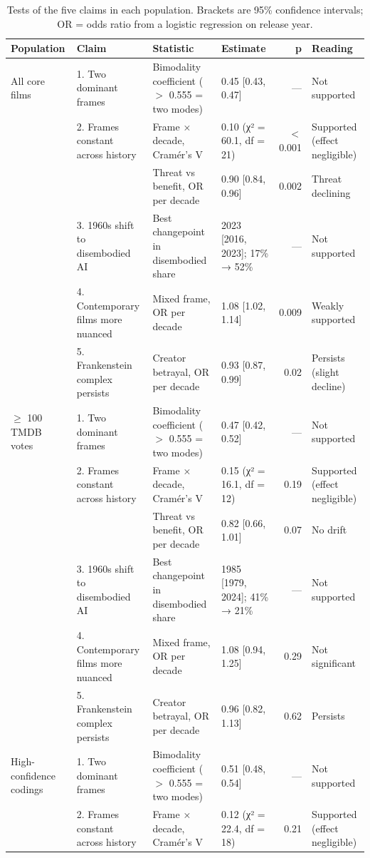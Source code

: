 \begin{table}[htbp]
\centering
\caption{Tests of the five claims in each population. Brackets are 95\% confidence intervals; OR = odds ratio from a logistic regression on release year.}
\label{tab:claim_tests}
\begin{tabular}{llllrl}
\toprule
Population & Claim & Statistic & Estimate & p & Reading \\
\midrule
All core films & 1. Two dominant frames & Bimodality coefficient ($>$ 0.555 = two modes) & 0.45 [0.43, 0.47] & — & Not supported \\
 & 2. Frames constant across history & Frame × decade, Cramér's V & 0.10 (χ² = 60.1, df = 21) & $<$ 0.001 & Supported (effect negligible) \\
 &  & Threat vs benefit, OR per decade & 0.90 [0.84, 0.96] & 0.002 & Threat declining \\
 & 3. 1960s shift to disembodied AI & Best changepoint in disembodied share & 2023 [2016, 2023]; 17\% → 52\% & — & Not supported \\
 & 4. Contemporary films more nuanced & Mixed frame, OR per decade & 1.08 [1.02, 1.14] & 0.009 & Weakly supported \\
 & 5. Frankenstein complex persists & Creator betrayal, OR per decade & 0.93 [0.87, 0.99] & 0.02 & Persists (slight decline) \\
$\geq$ 100 TMDB votes & 1. Two dominant frames & Bimodality coefficient ($>$ 0.555 = two modes) & 0.47 [0.42, 0.52] & — & Not supported \\
 & 2. Frames constant across history & Frame × decade, Cramér's V & 0.15 (χ² = 16.1, df = 12) & 0.19 & Supported (effect negligible) \\
 &  & Threat vs benefit, OR per decade & 0.82 [0.66, 1.01] & 0.07 & No drift \\
 & 3. 1960s shift to disembodied AI & Best changepoint in disembodied share & 1985 [1979, 2024]; 41\% → 21\% & — & Not supported \\
 & 4. Contemporary films more nuanced & Mixed frame, OR per decade & 1.08 [0.94, 1.25] & 0.29 & Not significant \\
 & 5. Frankenstein complex persists & Creator betrayal, OR per decade & 0.96 [0.82, 1.13] & 0.62 & Persists \\
High-confidence codings & 1. Two dominant frames & Bimodality coefficient ($>$ 0.555 = two modes) & 0.51 [0.48, 0.54] & — & Not supported \\
 & 2. Frames constant across history & Frame × decade, Cramér's V & 0.12 (χ² = 22.4, df = 18) & 0.21 & Supported (effect negligible) \\

\end{tabular}
\end{table}
